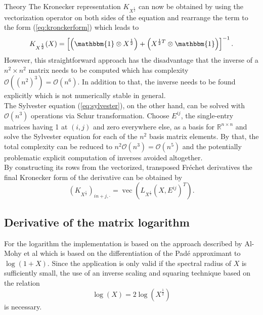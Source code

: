 \begin{chapter}{Theory}
The Kronecker representation $K_{X^{\frac{1}{2}}}$ can now be obtained by using the vectorization operator on both sides of the equation and rearrange the term
to the form (\ref{eq:kronckerform}) which leads to
\begin{equation}
    K_{X^{\frac{1}{2}}}(X)=\left[\left(\mathbbm{1}\otimes X^{\frac{1}{2}}\right)+\left(X^{\frac{1}{2}T}\otimes \mathbbm{1}\right) \right]^{-1}.
\end{equation}
However, this straightforward approach has the disadvantage that the inverse of a $n^2\times n^2$ matrix needs to be computed which has complexity
$\mathcal{O}((n^2)^3)=\mathcal{O}(n^6)$. In addition to that, the inverse needs to be found explicitly which is not numerically stable in general.\\

The Sylvester equation (\ref{eq:sylvester}), on the other hand, can be solved with $\mathcal{O}(n^3)$ operations via Schur transformation. Choose $E^{ij}$, the single-entry
matrices having 1 at $(i,j)$ and zero everywhere else, as a basis for $\mathbb{R}^{n\times n}$ and solve the Sylvester equation for each of the $n^2$ 
basis matrix elements. By that, the total complexity can be reduced to $n^2\mathcal{O}(n^3)=\mathcal{O}(n^5)$ and the 
potentially problematic explicit computation of inverses avoided altogether.\\

By constructing its rows from the vectorized, transposed Fr\'{e}chet derivatives the final Kronecker form of the derivative can be obtained by
\begin{equation}
    \left(K_{X^{\frac{1}{2}}}\right)_{in + j,\cdot} = \operatorname{vec}\left(L_{X^{\frac{1}{2}}}(X,E^{ij})^T\right).
\end{equation}

\subsection{Derivative of the matrix logarithm} %
\label{sub:Derivative of the matrix logarithm}
For the logarithm the implementation is based on the approach described by Al-Mohy et al \cite{AlmohyFrechet} 
which is based on the differentiation of the Pad\'{e} approximant to $\log(1+X)$.
Since the application is only valid if the spectral radius of $X$ is sufficiently small, the  use of an inverse scaling and squaring technique based on the relation
\begin{equation}
    \log(X) = 2\log(X^{\frac{1}{2}})
\end{equation}
is necessary.\\


\end{chapter}

